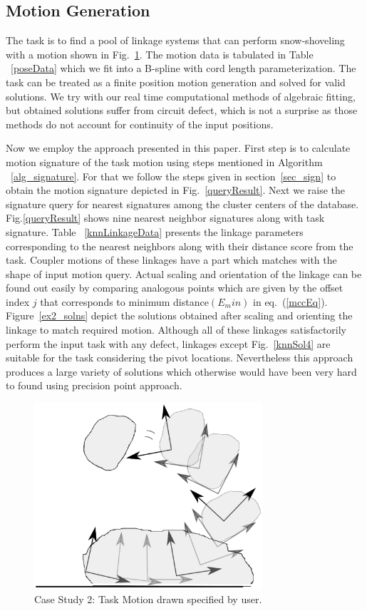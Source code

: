 \documentclass[twocolumn,10pt]{asme2e}
\newcommand{\req}[1]{(\ref{#1})}
\begin{document}
\subsection{Motion Generation}
The task is to find a pool of linkage systems that can perform snow-shoveling with a motion shown in Fig.~\ref{motionQuery}.
The motion data is tabulated in Table ~\ref{poseData} which we fit into a B-spline with cord length parameterization.
The task can be treated as a finite position motion generation and solved for valid solutions.
We try with our real time computational methods of algebraic fitting\cite{generalfitting-JCISE},\cite{deshpande2017} but obtained solutions suffer from circuit defect, which is not a surprise as those methods do not account for continuity of the input positions.

Now we employ the approach presented in this paper.
First step is to calculate motion signature of the task motion using steps mentioned in Algorithm ~\ref{alg_signature}.
For that we follow the steps given in section~\ref{sec_sign} to obtain the motion signature depicted in Fig.~\ref{queryResult}.
Next we raise the signature query for nearest signatures among the cluster centers of the database.
Fig.\ref{queryResult} shows nine nearest neighbor signatures along with task signature.
Table ~\ref{knnLinkageData} presents the linkage parameters corresponding to the nearest neighbors along with their distance score from the task.
Coupler motions of these linkages have a part which matches with the shape of input motion query.
Actual scaling and orientation of the linkage can be found out easily by comparing analogous points which are given by the offset index $j$ that corresponds to minimum distance$(E_min)$ in eq.~\req{mccEq}.
Figure~\ref{ex2_solns} depict the solutions obtained after scaling and orienting the linkage to match required motion.
Although all of these linkages satisfactorily perform the input task with any defect, linkages except Fig.~\ref{knnSol4} are suitable for the task considering the pivot locations.
Nevertheless this approach produces a large variety of solutions which otherwise would have been very hard to found using precision point approach.

\begin{figure}
\centering
\includegraphics[width=240pt]{figure/fig_motion_query.eps}
  \caption{Case Study 2: Task Motion drawn specified by user.}
\label{motionQuery}
\end{figure}
\end{document}
